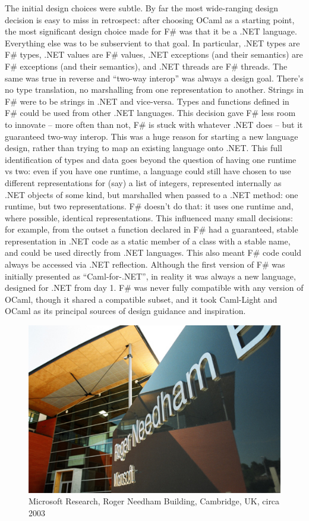 \documentclass[acmsmall]{acmart}\settopmatter{}
\begin{document}
The initial design choices were subtle.  By far the most wide-ranging design decision is easy to miss in retrospect: after choosing OCaml as a starting point, the most significant design choice made for F\# was that it be a .NET language.  Everything else was to be subservient to that goal.  In particular, .NET types are F\# types, .NET values are F\# values, .NET exceptions (and their semantics) are F\# exceptions (and their semantics), and .NET threads are F\# threads.  The same was true in reverse and “two-way interop” was always a design goal.  There’s no type translation, no marshalling from one representation to another. Strings in F\# were to be strings in .NET and vice-versa.  Types and functions defined in F\# could be used from other .NET languages. This decision gave F\# less room to innovate – more often than not, F\# is stuck with whatever .NET does – but it guaranteed two-way interop.  This was a huge reason for starting a new language design, rather than trying to map an existing language onto .NET.  This full identification of types and data goes beyond the question of having one runtime vs two: even if you have one runtime, a language could still have chosen to use different representations for (say) a list of integers, represented internally as .NET objects of some kind, but marshalled when passed to a .NET method: one runtime, but two representations. F\# doesn’t do that: it uses one runtime and, where possible, identical representations. This influenced many small decisions: for example, from the outset a function declared in F\# had a guaranteed, stable representation in .NET code as a static member of a class with a stable name, and could be used directly from .NET languages.  This also meant F\# code could always be accessed via .NET reflection.  Although the first version of F\# was initially presented as “Caml-for-.NET”, in reality it was always a new language, designed for .NET from day 1. F\# was never fully compatible with any version of OCaml, though it shared a compatible subset, and it took Caml-Light and OCaml as its principal sources of design guidance and inspiration.  

\begin{figure}

  \includegraphics[width=0.7\linewidth]{msft.jpg}
  \caption{Microsoft Research, Roger Needham Building, Cambridge, UK, circa 2003}
  \label{fig:msft}

\end{figure}
\end{document}
